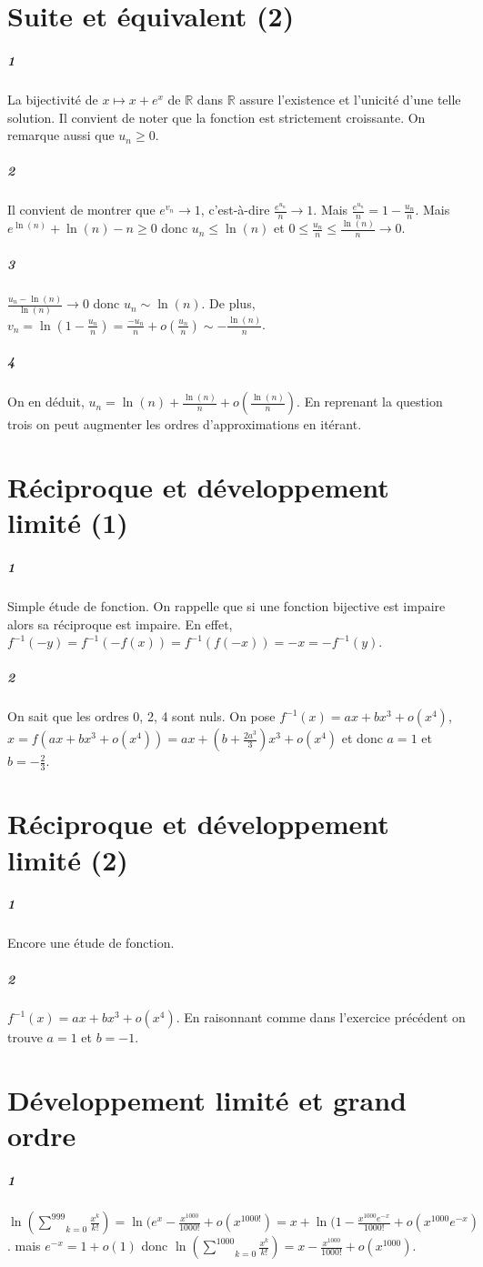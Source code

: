 \documentclass[10pt,a4paper]{article}
\newcommand{\summ}[2]{\underset{#1}{\overset{#2}{\sum}}}
\begin{document}
\section{Suite et équivalent (2)}
\subparagraph{1}La bijectivité de $x\mapsto x +e^x$ de $\mathbb{R}$ dans $\mathbb{R}$ assure l'existence et l'unicité d'une telle solution. Il convient de noter que la fonction est strictement croissante. On remarque aussi que $u_n \ge 0$.

\subparagraph{2}Il convient de montrer que $e^{v_n} \rightarrow 1$, c'est-à-dire $\frac{e^{u_n}}{n} \rightarrow 1$. Mais $\frac{e^{u_n}}{n} = 1 - \frac{u_n}{n}$. Mais $e^{\ln(n)} +\ln(n) -n \ge 0$ donc $u_n \le \ln(n)$ et $0 \le \frac{u_n}{n} \le \frac{\ln(n)}{n} \rightarrow 0$. 

\subparagraph{3}$\frac{u_n - \ln(n)}{\ln(n)} \rightarrow 0$ donc $u_n \sim \ln(n)$. De plus, $v_n = \ln(1- \frac{u_n}{n}) = \frac{-u_n}{n} + o(\frac{u_n}{n}) \sim -\frac{\ln(n)}{n}$.

\subparagraph{4}On en déduit, $u_n = \ln(n) + \frac{\ln(n)}{n} + o(\frac{\ln(n)}{n})$. En reprenant la question trois on peut augmenter les ordres d'approximations en itérant.

\section{Réciproque et développement limité (1)}
\subparagraph{1}Simple étude de fonction. On rappelle que si une fonction bijective est impaire alors sa réciproque est impaire. En effet, $f^{-1}(-y) = f^{-1}(-f(x))= f^{-1}(f(-x)) = -x = - f^{-1}(y)$.

\subparagraph{2}On sait que les ordres 0, 2, 4 sont nuls. On pose $f^{-1}(x) = ax + bx^3 +o(x^4)$, $x = f(ax+bx^3 +o(x^4)) = ax + (b + \frac{2a^3}{3})x^3 + o(x^4)$ et donc $a =1$ et $b= - \frac{2}{3}$.

\section{Réciproque et développement limité (2)}
\subparagraph{1}Encore une étude de fonction.
\subparagraph{2}$f^{-1}(x) = ax + bx^3 + o(x^4)$. En raisonnant comme dans l'exercice précédent on trouve $a = 1$ et $b= -1$.

\section{Développement limité et grand ordre}
\subparagraph{1}$\ln(\summ{k=0}{999} \frac{x^k}{k!}) = \ln(e^x -\frac{x^{1000}}{1000!} +o(x^{1000!}) = x + \ln(1 -\frac{x^{1000}e^{-x}}{1000!} + o(x^{1000}e^{-x})$. mais $e^{-x} = 1 +o(1)$ donc ${\ln(\summ{k=0}{1000} \frac{x^k}{k!}) = x - \frac{x^{1000}}{1000!} + o(x^{1000})}$.
\end{document}
